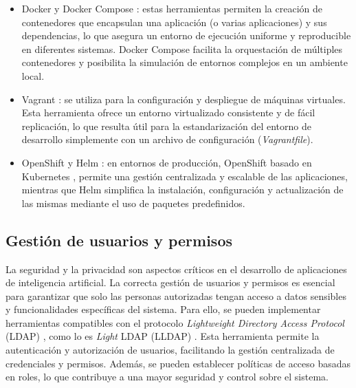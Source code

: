 \begin{itemize}
	\item Docker y Docker Compose \citep{merkel_docker_2014} \citep{docker_docker_0000}: estas herramientas permiten la creación de contenedores que encapsulan una aplicación (o varias aplicaciones) y sus dependencias, lo que asegura un entorno de ejecución uniforme y reproducible en diferentes sistemas. Docker Compose facilita la orquestación de múltiples contenedores y posibilita la simulación de entornos complejos en un ambiente local.
	\item Vagrant \citep{hashicorp_vagrant_2023} \citep{hashicorp_documentation_nodate}: se utiliza para la configuración y despliegue de máquinas virtuales. Esta herramienta ofrece un entorno virtualizado consistente y de fácil replicación, lo que resulta útil para la estandarización del entorno de desarrollo simplemente con un archivo de configuración (\textit{Vagrantfile}).
	\item OpenShift \citep{red_hat_openshift_2023} \citep{red_hat_red_nodate} y Helm \citep{the_helm_authors_helm_2023} \citep{the_helm_authors_docs_nodate}: en entornos de producción, OpenShift basado en Kubernetes \citep{wikipedia_kubernetes_2025}, permite una gestión centralizada y escalable de las aplicaciones, mientras que Helm simplifica la instalación, configuración y actualización de las mismas mediante el uso de paquetes predefinidos.
\end{itemize}

\subsection{Gestión de usuarios y permisos}

La seguridad y la privacidad son aspectos críticos en el desarrollo de aplicaciones de inteligencia artificial. La correcta gestión de usuarios y permisos es esencial para garantizar que solo las personas autorizadas tengan acceso a datos sensibles y funcionalidades específicas del sistema. Para ello, se pueden implementar herramientas compatibles con el protocolo \textit{Lightweight Directory Access Protocol} (LDAP) \citep{noauthor_protocolo_2024}, como lo es \textit{Light} LDAP (LLDAP) \citep{lldap_authors_lldap_2023}. Esta herramienta permite la autenticación y autorización de usuarios, facilitando la gestión centralizada de credenciales y permisos. Además, se pueden establecer políticas de acceso basadas en roles, lo que contribuye a una mayor seguridad y control sobre el sistema.

